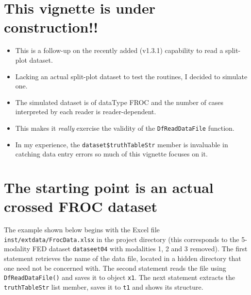 \documentclass[]{book}
\newenvironment{Shaded}{\begin{snugshade}}{\end{snugshade}}
\newcommand{\CommentTok}[1]{\textcolor[rgb]{0.56,0.35,0.01}{\textit{#1}}}
\newcommand{\DataTypeTok}[1]{\textcolor[rgb]{0.13,0.29,0.53}{#1}}
\newcommand{\KeywordTok}[1]{\textcolor[rgb]{0.13,0.29,0.53}{\textbf{#1}}}
\newcommand{\NormalTok}[1]{#1}
\newcommand{\OperatorTok}[1]{\textcolor[rgb]{0.81,0.36,0.00}{\textbf{#1}}}
\newcommand{\OtherTok}[1]{\textcolor[rgb]{0.56,0.35,0.01}{#1}}
\newcommand{\StringTok}[1]{\textcolor[rgb]{0.31,0.60,0.02}{#1}}
\providecommand{\tightlist}{%
  \setlength{\itemsep}{0pt}\setlength{\parskip}{0pt}}
\begin{document}
\hypertarget{this-vignette-is-under-construction}{%
\section{This vignette is under construction!!}\label{this-vignette-is-under-construction}}

\begin{itemize}
\tightlist
\item
  This is a follow-up on the recently added (v1.3.1) capability to read a split-plot dataset.
\item
  Lacking an actual split-plot dataset to test the routines, I decided to simulate one.
\item
  The simulated dataset is of dataType FROC and the number of cases interpreted by each reader is reader-dependent.
\item
  This makes it \emph{really} exercise the validity of the \texttt{DfReadDataFile} function.
\item
  In my experience, the \texttt{dataset\$truthTableStr} member is invaluable in catching data entry errors so much of this vignette focuses on it.
\end{itemize}

\hypertarget{the-starting-point-is-an-actual-crossed-froc-dataset}{%
\section{The starting point is an actual crossed FROC dataset}\label{the-starting-point-is-an-actual-crossed-froc-dataset}}

The example shown below begins with the Excel file \texttt{inst/extdata/FrocData.xlsx} in the project directory (this corresponds to the 5-modality FED dataset \texttt{dataseet04} \citep{RN1882} with modalities 1, 2 and 3 removed). The first statement retrieves the name of the data file, located in a hidden directory that one need not be concerned with. The second statement reads the file using \texttt{DfReadDataFile()} and saves it to object \texttt{x1}. The next statement extracts the \texttt{truthTableStr} list member, saves it to \texttt{t1} and shows its structure.

\begin{Shaded}
\end{Shaded}
\end{document}
